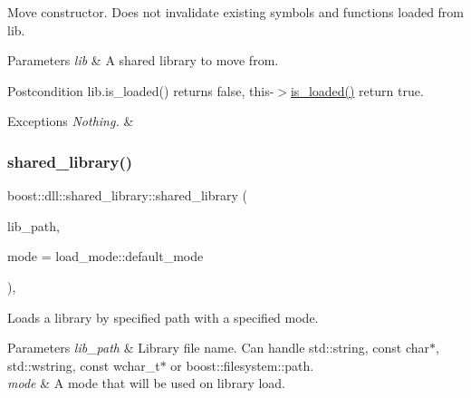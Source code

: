 Move constructor. Does not invalidate existing symbols and functions loaded from lib.


\begin{DoxyParams}{Parameters}
{\em lib} & A shared library to move from. \\
\hline
\end{DoxyParams}
\begin{DoxyPostcond}{Postcondition}
lib.\+is\+\_\+loaded() returns false, this-\/$>$\hyperlink{a01708_a31ec32c213665bd151f2c615f89f94ef}{is\+\_\+loaded()} return true. 
\end{DoxyPostcond}

\begin{DoxyExceptions}{Exceptions}
{\em Nothing.} & \\
\hline
\end{DoxyExceptions}
\mbox{\label{a01708_afbfcc22b1a9089f474f05760c09a2261}} 
\subsubsection{\texorpdfstring{shared\+\_\+library()}{shared\_library()}\hspace{0.1cm}{\footnotesize\ttfamily [5/7]}}
{\footnotesize\ttfamily boost\+::dll\+::shared\+\_\+library\+::shared\+\_\+library (\begin{DoxyParamCaption}\item[{const boost\+::filesystem\+::path \&}]{lib\+\_\+path,  }\item[{\hyperlink{a00272_a1918a602801479bc0bade54ff5665129}{load\+\_\+mode\+::type}}]{mode = {\ttfamily load\+\_\+mode\+:\+:default\+\_\+mode} }\end{DoxyParamCaption})\hspace{0.3cm}{\ttfamily [inline]}, {\ttfamily [explicit]}}

Loads a library by specified path with a specified mode.


\begin{DoxyParams}{Parameters}
{\em lib\+\_\+path} & Library file name. Can handle std\+::string, const char$\ast$, std\+::wstring, const wchar\+\_\+t$\ast$ or boost\+::filesystem\+::path. \\
\hline
{\em mode} & A mode that will be used on library load. \\
\hline
\end{DoxyParams}


